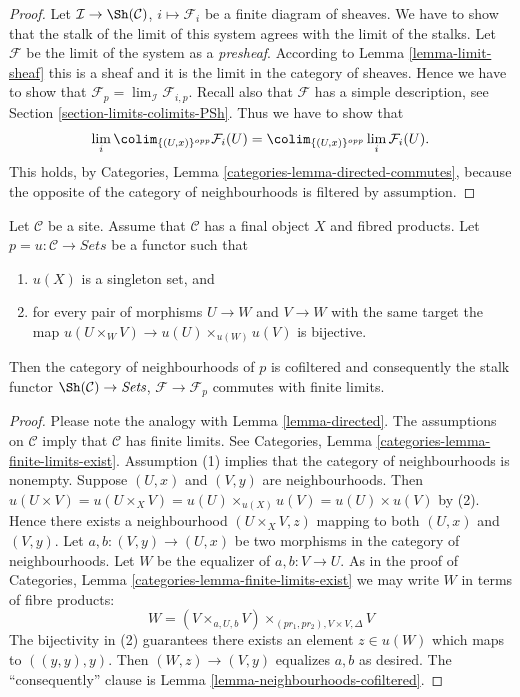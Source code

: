 \begin{proof}
Let $\mathcal{I} \to \Sh(\mathcal{C})$,
$i \mapsto \mathcal{F}_i$ be a finite diagram of sheaves.
We have to show that the stalk of the limit of this
system agrees with the limit of the stalks.
Let $\mathcal{F}$ be the limit of the system as a {\it presheaf}.
According to Lemma \ref{lemma-limit-sheaf} this is a sheaf and
it is the limit in the category of sheaves.
Hence we have to show that
$\mathcal{F}_p = \lim_\mathcal{I} \mathcal{F}_{i, p}$.
Recall also that $\mathcal{F}$ has a simple description, see
Section \ref{section-limits-colimits-PSh}. Thus we have to show that
$$
\lim_i \colim_{\{(U, x)\}^{opp}} \mathcal{F}_i(U)
=
\colim_{\{(U, x)\}^{opp}} \lim_i \mathcal{F}_i(U).
$$
This holds, by Categories, Lemma \ref{categories-lemma-directed-commutes},
because the opposite of the category of neighbourhoods is filtered
by assumption.
\end{proof}

\begin{lemma}
\label{lemma-neighbourhoods-directed}
Let $\mathcal{C}$ be a site. Assume that $\mathcal{C}$ has
a final object $X$ and fibred products.
Let $p = u : \mathcal{C} \to \textit{Sets}$ be a functor such that
\begin{enumerate}
\item $u(X)$ is a singleton set, and
\item for every pair of morphisms $U \to W$ and $V \to W$ with
the same target the map
$u(U \times_W V) \to u(U) \times_{u(W)} u(V)$ is bijective.
\end{enumerate}
Then the category of neighbourhoods of $p$ is cofiltered
and consequently the stalk functor $\Sh(\mathcal{C}) \to \textit{Sets}$,
$\mathcal{F} \to \mathcal{F}_p$ commutes with finite limits.
\end{lemma}

\begin{proof}
Please note the analogy with Lemma \ref{lemma-directed}.
The assumptions on $\mathcal{C}$ imply that $\mathcal{C}$ has finite limits.
See Categories, Lemma \ref{categories-lemma-finite-limits-exist}.
Assumption (1) implies that the category of neighbourhoods
is nonempty. Suppose $(U, x)$ and $(V, y)$ are neighbourhoods.
Then
$u(U \times V) = u(U \times_X V) =
u(U) \times_{u(X)} u(V) = u(U) \times u(V)$ by (2).
Hence there exists a neighbourhood $(U \times_X V, z)$ mapping
to both $(U, x)$ and $(V, y)$.
Let $a, b : (V, y) \to (U, x)$ be two morphisms
in the category of neighbourhoods. Let $W$ be the equalizer of
$a, b : V \to U$. As in the proof of
Categories, Lemma \ref{categories-lemma-finite-limits-exist}
we may write $W$ in terms of fibre products:
$$
W = (V \times_{a, U, b} V) \times_{(pr_1, pr_2), V \times V, \Delta} V
$$
The bijectivity in (2) guarantees there exists an element $z \in u(W)$
which maps to $((y, y), y)$.
Then $(W, z) \to (V, y)$ equalizes $a, b$ as desired.
The ``consequently'' clause is Lemma \ref{lemma-neighbourhoods-cofiltered}.
\end{proof}

